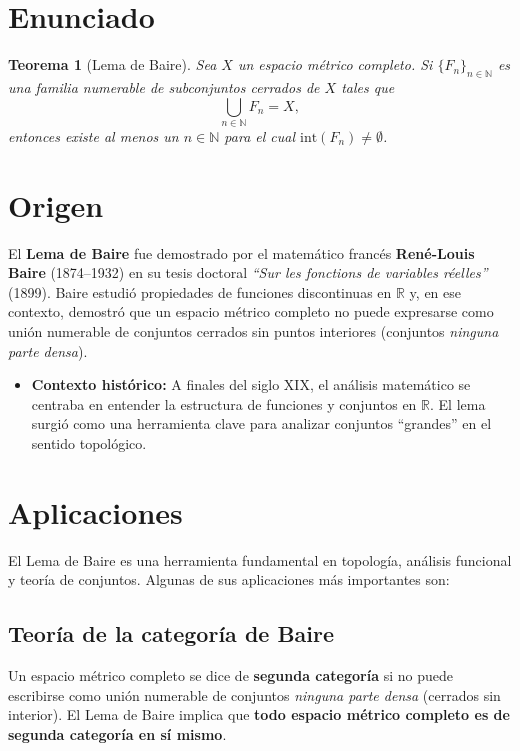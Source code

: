 \documentclass[12pt]{book}
\theoremstyle{definition}
\theoremstyle{plain}
\newtheorem{teorema}{Teorema}[section]
\theoremstyle{remark}
\begin{document}
\section*{Enunciado}
\begin{teorema}[Lema de Baire]
Sea \( X \) un espacio métrico completo. Si \( \{F_n\}_{n \in \mathbb{N}} \) es una familia numerable de subconjuntos cerrados de \( X \) tales que
\[
\bigcup_{n \in \mathbb{N}} F_n = X,
\]
entonces existe al menos un \( n \in \mathbb{N} \) para el cual \( \text{int}(F_n) \neq \emptyset \).
\end{teorema}

\section*{Origen}
El \textbf{Lema de Baire} fue demostrado por el matemático francés \textbf{René-Louis Baire} (1874--1932) en su tesis doctoral \textit{``Sur les fonctions de variables réelles''} (1899). Baire estudió propiedades de funciones discontinuas en \( \mathbb{R} \) y, en ese contexto, demostró que un espacio métrico completo no puede expresarse como unión numerable de conjuntos cerrados sin puntos interiores (conjuntos \textit{ninguna parte densa}).

\begin{itemize}
    \item \textbf{Contexto histórico:} A finales del siglo XIX, el análisis matemático se centraba en entender la estructura de funciones y conjuntos en \( \mathbb{R} \). El lema surgió como una herramienta clave para analizar conjuntos ``grandes'' en el sentido topológico.
\end{itemize}

\section*{Aplicaciones}
El Lema de Baire es una herramienta fundamental en topología, análisis funcional y teoría de conjuntos. Algunas de sus aplicaciones más importantes son:

\subsection*{Teoría de la categoría de Baire}
Un espacio métrico completo se dice de \textbf{segunda categoría} si no puede escribirse como unión numerable de conjuntos \textit{ninguna parte densa} (cerrados sin interior). El Lema de Baire implica que \textbf{todo espacio métrico completo es de segunda categoría en sí mismo}.
\end{document}
